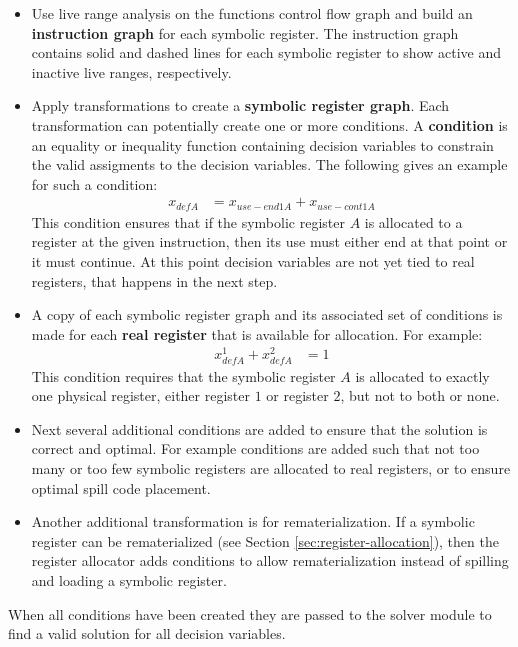 \documentclass[a4paper,10pt]{article}
\begin{document}
\begin{itemize}
 \item Use live range analysis on the functions control flow graph and build an \textbf{instruction graph} for each symbolic register.
       The instruction graph contains solid and dashed lines for each symbolic register to show active and inactive live ranges,
       respectively.
 \item Apply transformations to create a \textbf{symbolic register graph}. Each transformation can potentially create one or more
       conditions. A \textbf{condition} is an equality or inequality function containing decision variables to constrain the valid
       assigments to the decision variables. The following gives an example for such a condition:
       \begin{align}
        x_{defA} &= x_{use-end1A} + x_{use-cont1A}
       \end{align}
       This condition ensures that if the symbolic register $A$ is allocated to a register at the given instruction, then its use must
       either end at that point or it must continue. At this point decision variables are not yet tied to real registers, that happens
       in the next step.
 \item A copy of each symbolic register graph and its associated set of conditions is made for each \textbf{real register} that is
       available for allocation. For example:
       \begin{align}
        x^1_{defA} + x^2_{defA} &= 1
       \end{align}
       This condition requires that the symbolic register $A$ is allocated to exactly one physical register, either register $1$ or
       register $2$, but not to both or none.
 \item Next several additional conditions are added to ensure that the solution is correct and optimal. For example conditions are
       added such that not too many or too few symbolic registers are allocated to real registers, or to ensure optimal spill code
       placement.
 \item Another additional transformation is for rematerialization. If a symbolic register can be rematerialized (see Section
       \ref{sec:register-allocation}), then the register allocator adds conditions to allow rematerialization instead of spilling
       and loading a symbolic register.
\end{itemize}

When all conditions have been created they are passed to the solver module to find a valid solution for all decision variables.
\end{document}

